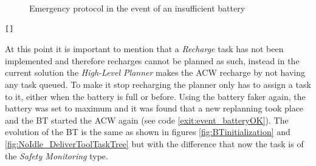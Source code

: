 \begin{figure}[htbp]
    \centering
    \hfill
    \hfill
    \caption{Emergency protocol in the event of an insufficient battery}
    \label{fig:event_battery}
\end{figure}

\begin{lstlisting}[caption={Printed feedback messages after insufficient battery communication}, breaklines=true, label=exit:event_battery]
	[]
\end{lstlisting}

At this point it is important to mention that a \emph{Recharge} task has not been implemented and therefore recharges cannot be planned as such, instead in the current solution the \emph{High-Level Planner} makes the \gls{ACW} recharge by not having any task queued. To make it stop recharging the planner only has to assign a task to it, either when the battery is full or before. Using the battery faker again, the battery was set to maximum and it was found that a new replanning took place and the \gls{BT} started the \gls{ACW} again (see code \ref{exit:event_batteryOK}). The evolution of the \gls{BT} is the same as shown in figures \ref{fig:BTinitialization} and \ref{fig:NoIdle_DeliverToolTaskTree} but with the difference that now the task is of the \emph{Safety Monitoring} type.

